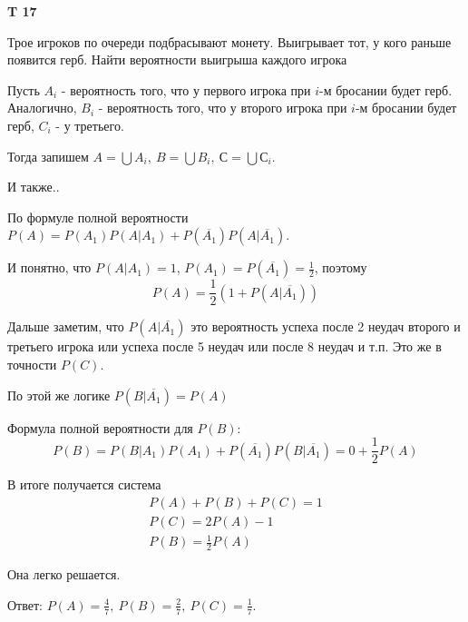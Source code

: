 \documentclass[a4paper,12pt]{article} %
\begin{document}
\begin{example}\textbf{T 17}

Трое игроков по очереди подбрасывают монету. 
Выигрывает тот, у кого раньше появится герб. 
Найти вероятности выигрыша каждого игрока

Пусть $A_i$ - вероятность того, что у первого игрока при $ i$-м бросании будет герб. 
Аналогично, $B_i$ - вероятность того, что у второго игрока при $ i$-м бросании будет герб, $ C_i$ - у третьего.

Тогда запишем $A=\bigcup A_i, \ B=\bigcup B_i, \ С=\bigcup С_i$.

И также..


По формуле полной вероятности $ P(A)= P(A_1) P(A|A_1)+ P(\overline{A_1}) P(A|\overline{A_1})$. 

И понятно, что $P(A|A_1)=1$, $P(A_1)=P(\overline{A_1})=\frac{1}{2}$, поэтому 
\[ P(A)=\frac{1}{2}(1+P(A|\overline{A_1})) \]

Дальше заметим, что $P(A|\overline{A_1})$ это вероятность успеха после 2 неудач второго и третьего 
игрока или успеха после 5 неудач или после 8 неудач и т.п. Это же в точности $ P(C)$.

По этой же логике $ P(B|\overline{A_1})=P(A) $

Формула полной вероятности для $ P(B)$:
\[ P(B)=P(B|A_1) P(A_1)+P(\overline{A_1}) P(B|\overline{A_1})=0+\frac{1}{2} P(A) \]

В итоге получается система 
\begin{align}
P(A)+P(B)+P(C)=1\\
P(C)=2P(A)-1\\
P(B)=\frac{1}{2} P(A)
\end{align}

Она легко решается.

Ответ: $ P(A)=\frac{4}{7}, \ P(B)=\frac{2}{7}, \ P(C)=\frac{1}{7}$.


\end{example}
\end{document}
